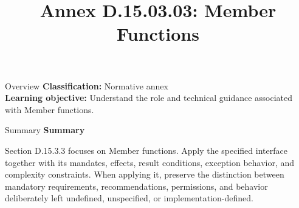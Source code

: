 \documentclass[10pt,letterpaper]{article}
\title{Annex D.15.03.03: Member Functions}
\author{}
\date{}
\begin{document}
\maketitle
\begin{CornellOverviewBox}{Overview}
\textbf{Classification:} Normative annex\\[2pt]
\textbf{Learning objective:} Understand the role and technical guidance associated with Member functions.
\end{CornellOverviewBox}\begin{CornellSummaryBox}{Summary}
{\sffamily\bfseries\color{Accent} Summary}\par\vspace{3pt}Section D.15.3.3 focuses on Member functions. Apply the specified interface together with its mandates, effects, result conditions, exception behavior, and complexity constraints. When applying it, preserve the distinction between mandatory requirements, recommendations, permissions, and behavior deliberately left undefined, unspecified, or implementation-defined.
\end{CornellSummaryBox}
\end{document}
